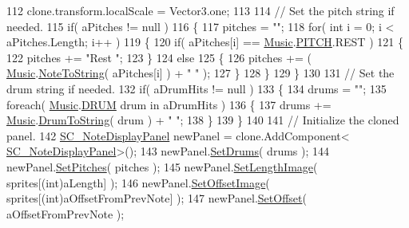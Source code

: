 \begin{DoxyCode}
112             clone.transform.localScale = Vector3.one;
113 
114             \textcolor{comment}{// Set the pitch string if needed.}
115             \textcolor{keywordflow}{if}( aPitches != null )
116             \{
117                 pitches = \textcolor{stringliteral}{""};
118                 \textcolor{keywordflow}{for}( \textcolor{keywordtype}{int} i = 0; i < aPitches.Length; i++ )
119                 \{
120                     \textcolor{keywordflow}{if}( aPitches[i] == \hyperlink{class_music}{Music}.\hyperlink{group___music_enums_ga508f69b199ea518f935486c990edac1d}{PITCH}.REST )
121                     \{
122                         pitches += \textcolor{stringliteral}{"Rest "};
123                     \}
124                     \textcolor{keywordflow}{else}
125                     \{
126                         pitches += ( \hyperlink{class_music}{Music}.\hyperlink{group___music_stat_func_ga85a22c905d56d4c5f4e62159bfecee8c}{NoteToString}( aPitches[i] ) + \textcolor{stringliteral}{" "} );
127                     \}
128                 \}
129             \}
130 
131             \textcolor{comment}{// Set the drum string if needed.}
132             \textcolor{keywordflow}{if}( aDrumHits != null )
133             \{
134                 drums = \textcolor{stringliteral}{""};
135                 \textcolor{keywordflow}{foreach}( \hyperlink{class_music}{Music}.\hyperlink{group___music_enums_gade475b4382c7066d1af13e7c13c029b6}{DRUM} drum in aDrumHits )
136                 \{
137                     drums += \hyperlink{class_music}{Music}.\hyperlink{group___music_stat_func_gaf5f64ebe9a7e036e07f283e41f26d22b}{DrumToString}( drum ) + \textcolor{stringliteral}{" "};
138                 \}
139             \}
140 
141             \textcolor{comment}{// Initialize the cloned panel.}
142             \hyperlink{class_s_c___note_display_panel}{SC\_NoteDisplayPanel} newPanel = clone.AddComponent<
      \hyperlink{class_s_c___note_display_panel}{SC\_NoteDisplayPanel}>();
143             newPanel.\hyperlink{group___s_c___n_d_p_unity_gae14b5564be204df7699b95186d83f69f}{SetDrums}( drums );
144             newPanel.\hyperlink{group___s_c___n_d_p_unity_gad9bf776f0c51cf6170faccf9fc4ac7e0}{SetPitches}( pitches );
145             newPanel.\hyperlink{group___s_c___n_d_p_unity_ga1a1c4b8111463ec3e134d17fe5064a54}{SetLengthImage}( sprites[(\textcolor{keywordtype}{int})aLength] );
146             newPanel.\hyperlink{group___s_c___n_d_p_unity_gaa0a517d1359cd1ed109a130bd52763f1}{SetOffsetImage}( sprites[(\textcolor{keywordtype}{int})aOffsetFromPrevNote] );
147             newPanel.\hyperlink{group___s_c___n_d_p_unity_ga8ff7588e8c3f59a03842feaff92f97e9}{SetOffset}( aOffsetFromPrevNote );

\end{DoxyCode}
